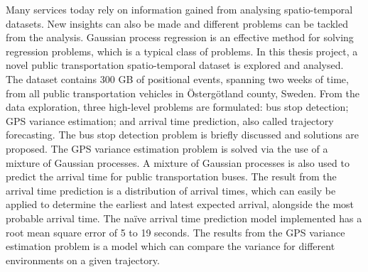 Many services today rely on information gained from analysing spatio-temporal datasets.
New insights can also be made and different problems can be tackled from the analysis.
Gaussian process regression is an effective method for solving regression problems, which is a typical class of problems.
In this thesis project, a novel public transportation spatio-temporal dataset is explored and analysed.
The dataset contains 300 GB of positional events, spanning two weeks of time, from all public transportation vehicles in Östergötland county, Sweden.
From the data exploration, three high-level problems are formulated: bus stop detection; GPS variance estimation; and arrival time prediction, also called trajectory forecasting.
The bus stop detection problem is briefly discussed and solutions are proposed.
The GPS variance estimation problem is solved via the use of a mixture of Gaussian processes.
A mixture of Gaussian processes is also used to predict the arrival time for public transportation buses.
The result from the arrival time prediction is a distribution of arrival times, which can easily be applied to determine the earliest and latest expected arrival, alongside the most probable arrival time.
The naïve arrival time prediction model implemented has a root mean square error of 5 to 19 seconds.
The results from the GPS variance estimation problem is a model which can compare the variance for different environments on a given trajectory.